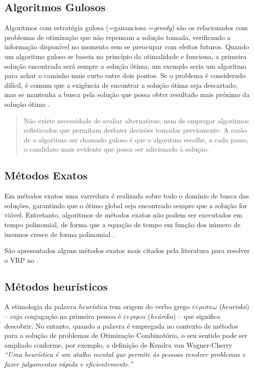 \subsection{Algoritmos Gulosos}
\label{gulosos}
Algoritmos com estratégia gulosa (=gananciosa =\emph{greedy}) \cite{feofiloff} são os relacionados com problemas de otimização que não repensam a solução tomada, verificando a informação disponível no momento sem se preocupar com efeitos futuros. Quando um algoritmo guloso se baseia no princípio da otimalidade e funciona, a primeira solução encontrada será sempre a solução ótima, um exemplo seria um algoritmo para achar o caminho mais curto entre dois pontos. Se o problema é considerado difícil, é comum que a exigência de encontrar a solução ótima seja descartado, mas se mantenha a busca pela solução que possa obter resultado mais próximo da solução ótima \cite[p. 60]{ziviani}.

\begin{quote}
Não existe necessidade de avaliar alternativas, nem de empregar algoritmos sofisticados que permitam desfazer decisões tomadas previamente. A razão de o algoritmo ser chamado guloso é que o algoritmo escolhe, a cada passo, o candidato mais evidente que possa ser adicionado à solução.
\end{quote}

\subsection{Métodos Exatos} \label{metodos-exatos}

Em métodos exatos uma varredura é realizada sobre todo o domínio de busca das soluções, garantindo que o ótimo global seja encontrado sempre que a solução for viável. Entretanto, algoritmos de métodos exatos não podem ser executados em tempo polinomial, de forma que a equação de tempo em função dos número de insumos cresce de forma polinomial \cite{maxwell}. 

São apresentados alguns métodos exatos mais citados pela literatura para resolver o VRP no .

\subsection{Métodos heurísticos}\label{heuristica}
A etimologia da palavra \emph{heurística} tem origem do verbo grego $\varepsilon \upsilon \rho \iota \sigma \kappa \omega$ (\emph{heuriskō}) -- cuja conjugação na primeira pessoa é  $\varepsilon \upsilon \rho 	\eta \kappa \alpha$ (\emph{heúrēka}) -- que significa descobrir. No entanto, quando a palavra é empregada no contexto de métodos para a solução de problemas de Otimização Combinatória, o seu sentido pode ser ampliado conforme, por exemplo, a definição de Kendra van Wagner-Cherry \emph{``Uma heurística é um atalho mental que permite às pessoas resolver problemas e fazer julgamentos rápida e eficientemente.''} \cite{goldbarg}


